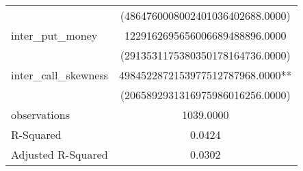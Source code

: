 \begin{tabular}{lc}
                      & (4864760008002401036402688.0000)      \\
inter\_put\_money     & 1229162695656006689488896.0000        \\
                      & (2913531175380350178164736.0000)      \\
inter\_call\_skewness & 4984522872153977512787968.0000**      \\
                      & (2065892931316975986016256.0000)      \\
observations          & 1039.0000                             \\
R-Squared             & 0.0424                                \\
Adjusted R-Squared    & 0.0302                                \\
\hline
\end{tabular}